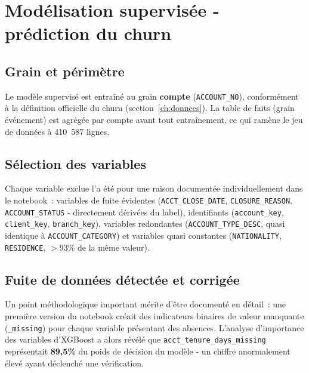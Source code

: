 \documentclass[11pt,a4paper]{report}
\begin{document}
\chapter{Mod\'elisation supervis\'ee - pr\'ediction du churn}
\label{ch:ml}

\section{Grain et p\'erim\`etre}

Le mod\`ele supervis\'e est entra\^in\'e au grain \textbf{compte}
(\texttt{ACCOUNT\_NO}), conform\'ement \`a la d\'efinition officielle du churn
(section~\ref{ch:donnees}). La table de faits (grain \'ev\'enement) est agr\'eg\'ee
par compte avant tout entra\^inement, ce qui ram\`ene le jeu de donn\'ees \`a
410~587 lignes.

\section{S\'election des variables}

Chaque variable exclue l'a \'et\'e pour une raison document\'ee individuellement
dans le notebook~: variables de fuite \'evidentes
(\texttt{ACCT\_CLOSE\_DATE}, \texttt{CLOSURE\_REASON}, \texttt{ACCOUNT\_STATUS}
- directement d\'eriv\'ees du label), identifiants
(\texttt{account\_key}, \texttt{client\_key}, \texttt{branch\_key}), variables
redondantes (\texttt{ACCOUNT\_TYPE\_DESC}, quasi identique \`a
\texttt{ACCOUNT\_CATEGORY}) et variables quasi constantes
(\texttt{NATIONALITY}, \texttt{RESIDENCE}, $>$93\% de la m\^eme valeur).

\section{Fuite de donn\'ees d\'etect\'ee et corrig\'ee}
\label{sec:leakage}

Un point m\'ethodologique important m\'erite d'\^etre document\'e en d\'etail~: une
premi\`ere version du notebook cr\'eait des indicateurs binaires de valeur
manquante (\texttt{\_missing}) pour chaque variable pr\'esentant des absences.
L'analyse d'importance des variables d'XGBoost a alors r\'ev\'el\'e que
\texttt{acct\_tenure\_days\_missing} repr\'esentait \textbf{89,5\%} du poids de
d\'ecision du mod\`ele - un chiffre anormalement \'elev\'e ayant d\'eclench\'e une
v\'erification.
\end{document}
